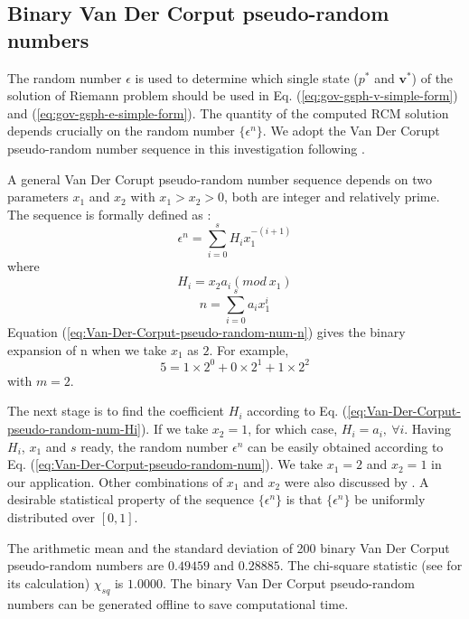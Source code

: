 \documentclass[review]{elsarticle}
\begin{document}
\subsection{Binary Van Der Corput pseudo-random numbers}
The random number $\epsilon$ is used to determine which single state ($p^{\ast}$ and $\textbf{v}^{\ast}$) of the solution of Riemann problem should be used in Eq. (\ref{eq:gov-gsph-v-simple-form}) and (\ref{eq:gov-gsph-e-simple-form}). The quantity of the computed RCM solution depends crucially on the random number $\{\epsilon ^n\}$. We adopt the Van Der Corupt pseudo-random number sequence \citep{hammersley2013monte} in this investigation following \citet{colella1982glimm}.

A general Van Der Corupt pseudo-random number sequence depends on two parameters $x_1$ and $x_2$ with $x_1 > x_2 > 0$, both are integer and relatively prime. The sequence is formally defined as \citep{hammersley2013monte}:
\begin{equation}
\epsilon ^n = \sum_{i=0}^{s} H_i x_1^{-(i+1)}
\label{eq:Van-Der-Corput-pseudo-random-num}
\end{equation}
where
\begin{equation}
H_i = x_2 a_i(mod \ x_1)
\label{eq:Van-Der-Corput-pseudo-random-num-Hi}
\end{equation} 
\begin{equation}
n = \sum_{i=0}^{s} a_i x_1^i
\label{eq:Van-Der-Corput-pseudo-random-num-n}
\end{equation} 
Equation (\ref{eq:Van-Der-Corput-pseudo-random-num-n}) gives the binary expansion of n when we take $x_1$ as $2$. For example,
\begin{equation}
5=1 \times 2^0 + 0 \times 2^1 + 1 \times 2^2
\end{equation}
with $m=2$. 

The next stage is to find the coefficient $H_i$ according to Eq. (\ref{eq:Van-Der-Corput-pseudo-random-num-Hi}). If we take $x_2 = 1$, for which case, $H_i = a_i, \ \forall i$. Having $H_i$, $x_1$ and $s$ ready, the random number $\epsilon ^n $ can be easily obtained according to Eq. (\ref{eq:Van-Der-Corput-pseudo-random-num}).
We take $x_1=2$  and $x_2 =1$ in our application. Other combinations of $x_1$ and $x_2$ were also discussed by \citet{toro2013riemann}. A desirable statistical property of the sequence $\{\epsilon ^n\}$ is that $\{\epsilon ^n\}$ be uniformly distributed over $[0,1]$.
 
The arithmetic mean and the standard deviation of 200 binary Van Der Corput pseudo-random numbers are $0.49459$ and $0.28885$. The chi-square statistic (see \citet{toro2013riemann} for its calculation) $\chi_{sq}$ is $1.0000$. 
The binary Van Der Corput pseudo-random numbers can be generated offline to save computational time.
\end{document}
